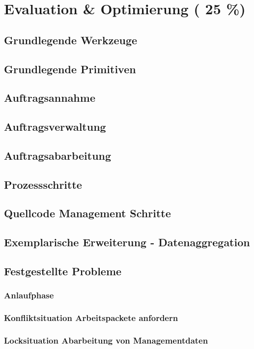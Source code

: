 \chapter{Evaluation \& Optimierung ( 25 \%)}

\section{Grundlegende Werkzeuge}
\section{Grundlegende Primitiven}
\section{Auftragsannahme}
\section{Auftragsverwaltung}
\section{Auftragsabarbeitung}
\section{Prozessschritte}
\section{Quellcode Management Schritte}
\section{Exemplarische Erweiterung - Datenaggregation}

\section{Festgestellte Probleme}
\subsection{Anlaufphase}
\subsection{Konfliktsituation Arbeitspackete anfordern}
\subsection{Locksituation Abarbeitung von Managementdaten}

